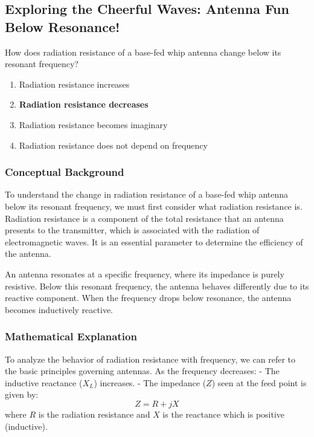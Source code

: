 \subsection{Exploring the Cheerful Waves: Antenna Fun Below Resonance!}

\begin{tcolorbox}[colback=gray!10, colframe=black, title=E9D10] How does radiation resistance of a base-fed whip antenna change below its resonant frequency?

\begin{enumerate}[label=\Alph*.]
    \item Radiation resistance increases
    \item \textbf{Radiation resistance decreases}
    \item Radiation resistance becomes imaginary
    \item Radiation resistance does not depend on frequency
\end{enumerate} \end{tcolorbox}

\subsubsection{Conceptual Background}

To understand the change in radiation resistance of a base-fed whip antenna below its resonant frequency, we must first consider what radiation resistance is. Radiation resistance is a component of the total resistance that an antenna presents to the transmitter, which is associated with the radiation of electromagnetic waves. It is an essential parameter to determine the efficiency of the antenna.

An antenna resonates at a specific frequency, where its impedance is purely resistive. Below this resonant frequency, the antenna behaves differently due to its reactive component. When the frequency drops below resonance, the antenna becomes inductively reactive.

\subsubsection{Mathematical Explanation}

To analyze the behavior of radiation resistance with frequency, we can refer to the basic principles governing antennas. As the frequency decreases:
- The inductive reactance (\(X_L\)) increases.
- The impedance (\(Z\)) seen at the feed point is given by:
\[
Z = R + jX
\]
where \(R\) is the radiation resistance and \(X\) is the reactance which is positive (inductive). 

